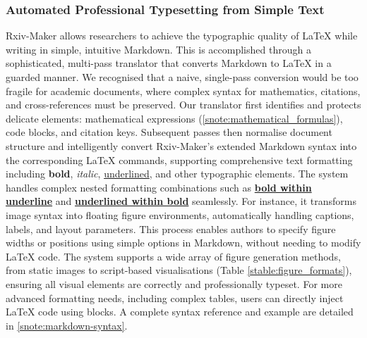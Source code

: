 \documentclass[times, twoside]{rxiv_maker_style}
\begin{document}
\subsubsection{Automated Professional Typesetting from Simple Text}
Rxiv-Maker allows researchers to achieve the typographic quality of LaTeX while writing in simple, intuitive Markdown. This is accomplished through a sophisticated, multi-pass translator that converts Markdown to LaTeX in a guarded manner. We recognised that a naive, single-pass conversion would be too fragile for academic documents, where complex syntax for mathematics, citations, and cross-references must be preserved.
Our translator first identifies and protects delicate elements: mathematical expressions (\ref{snote:mathematical_formulas}), code blocks, and citation keys. Subsequent passes then normalise document structure and intelligently convert Rxiv-Maker's extended Markdown syntax into the corresponding LaTeX commands, supporting comprehensive text formatting including \textbf{bold}, \textit{italic}, \underline{underlined}, and other typographic elements. The system handles complex nested formatting combinations such as \underline{\textbf{bold within underline}} and \textbf{\underline{underlined within bold}} seamlessly. For instance, it transforms image syntax into floating figure environments, automatically handling captions, labels, and layout parameters. This process enables authors to specify figure widths or positions using simple options in Markdown, without needing to modify LaTeX code. The system supports a wide array of figure generation methods, from static images to script-based visualisations (Table \ref{stable:figure_formats}), ensuring all visual elements are correctly and professionally typeset. For more advanced formatting needs, including complex tables, users can directly inject LaTeX code using \texttt{} blocks. A complete syntax reference and example are detailed in \ref{snote:markdown-syntax}.
\end{document}
